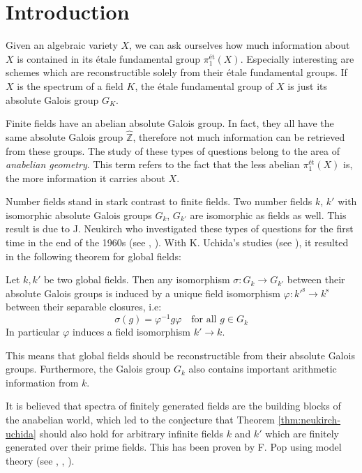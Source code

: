 \chapter{Introduction}

Given an algebraic variety $X$, we can ask ourselves how much information about $X$ is contained in its étale fundamental group $\pi_1^{\text{ét}}(X)$. Especially interesting are schemes which are reconstructible solely from their étale fundamental groups. If $X$ is the spectrum of a field $K$, the étale fundamental group of $X$ is just its absolute Galois group $G_K$. 

Finite fields have an abelian absolute Galois group. In fact, they all have the same absolute Galois group $\widehat{\mathbb{Z}}$, therefore not much information can be retrieved from these groups. The study of these types of questions belong to the area of \textit{anabelian geometry}. This term refers to the fact that the less abelian $\pi_1^\text{ét}(X)$ is, the more information it carries about $X$.

Number fields stand in stark contrast to finite fields. Two number fields $k$, $k'$ with isomorphic absolute Galois groups $G_k$, $G_{k'}$ are isomorphic as fields as well. This result is due to J. Neukirch who investigated these types of questions for the first time in the end of the 1960s (see \cite{Ne69}, \cite{Ne77}). With K. Uchida's studies (see \cite{Uc77}), it resulted in the following theorem for global fields:

\begin{theorem}\label{thm:neukirch-uchida}
Let $k,k'$ be two global fields. Then any isomorphism $\sigma: G_k\to G_{k'}$ between their absolute Galois groups is induced by a unique field isomorphism $\varphi: k'^{\text{s}}\to k^\text{s}$ between their separable closures, i.e: 
\[\sigma(g) =\varphi^{-1}g\varphi \quad \text{for all }g\in G_k\] 
In particular $\varphi$ induces a field isomorphism $k'\to k$.
\end{theorem}

This means that global fields should be reconstructible from their absolute Galois groups. Furthermore, the Galois group $G_k$ also contains important arithmetic information from $k$. 

It is believed that spectra of finitely generated fields are the building blocks of the anabelian world, which led to the conjecture that Theorem \ref{thm:neukirch-uchida} should also hold for arbitrary infinite fields $k$ and $k'$ which are finitely generated over their prime fields. This has been proven by F. Pop using model theory (see \cite{Po90}, \cite{Po94}, \cite{Po95}). 

